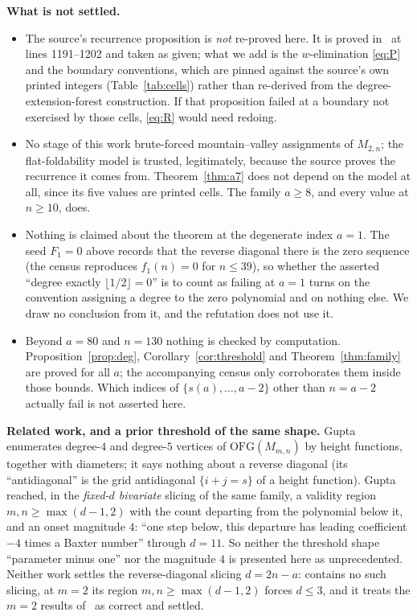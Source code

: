 \documentclass[11pt]{amsart}
\theoremstyle{remark}
\newcommand{\OFG}{\mathrm{OFG}}
\begin{document}
\medskip
\noindent\textbf{What is not settled.}
\begin{itemize}
\item The source's recurrence proposition is \emph{not} re-proved here. It is
proved in~\cite{CHOPTY} at lines 1191--1202 and taken as given; what we add is
the $w$-elimination \eqref{eq:P} and the boundary conventions, which are pinned
against the source's own printed integers (Table~\ref{tab:cells}) rather than
re-derived from the degree-extension-forest construction. If that proposition
failed at a boundary not exercised by those cells, \eqref{eq:R} would need
redoing.
\item No stage of this work brute-forced mountain--valley assignments of
$M_{2,n}$; the flat-foldability model is trusted, legitimately, because the
source proves the recurrence it comes from. Theorem~\ref{thm:a7} does not
depend on the model at all, since its five values are printed cells. The family
$a\ge8$, and every value at $n\ge10$, does.
\item Nothing is claimed about the theorem at the degenerate index $a=1$. The
seed $F_1=0$ above records that the reverse diagonal there is the zero sequence
(the census reproduces $f_1(n)=0$ for $n\le39$), so whether the asserted
``degree exactly $\lfloor1/2\rfloor=0$'' is to count as failing at $a=1$ turns
on the convention assigning a degree to the zero polynomial and on nothing else.
We draw no conclusion from it, and the refutation does not use it.
\item Beyond $a=80$ and $n=130$ nothing is checked by computation.
Proposition~\ref{prop:deg}, Corollary~\ref{cor:threshold} and
Theorem~\ref{thm:family} are proved for all $a$; the accompanying census only
corroborates them inside those bounds. Which indices of
$\{s(a),\dots,a-2\}$ other than $n=a-2$ actually fail is not asserted here.
\end{itemize}

\medskip
\noindent\textbf{Related work, and a prior threshold of the same shape.}
Gupta~\cite{GuptaOne} enumerates degree-$4$ and degree-$5$ vertices of
$\OFG(M_{m,n})$ by height functions, together with diameters; it says nothing
about a reverse diagonal (its ``antidiagonal'' is the grid antidiagonal
$\{i+j=s\}$ of a height function). Gupta~\cite{GuptaTwo} reached, in the
\emph{fixed-$d$ bivariate} slicing of the same family, a validity region
$m,n\ge\max(d-1,2)$ with the count departing from the polynomial below it, and
an onset magnitude $4$: ``one step below, this departure has leading
coefficient $-4$ times a Baxter number'' through $d=11$. So neither the
threshold shape ``parameter minus one'' nor the magnitude $4$ is presented here
as unprecedented. Neither work settles the reverse-diagonal slicing $d=2n-a$:
\cite{GuptaTwo} contains no such slicing, at $m=2$ its region
$m,n\ge\max(d-1,2)$ forces $d\le3$, and it treats the $m=2$ results
of~\cite{CHOPTY} as correct and settled.
\end{document}

